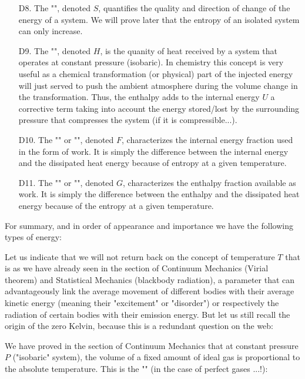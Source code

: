 \begin{enumerate}
		\item[D8.] The "", denoted $S$, quantifies the quality and direction of change of the energy of a system. We will prove later that the entropy of an isolated system can only increase.
		
		\item[D9.] The "", denoted $H$, is the quanity of heat received by a system that operates at constant pressure (isobaric). In chemistry this concept is very useful as a chemical transformation (or physical) part of the injected energy will just served to push the ambient atmosphere during the volume change in the transformation. Thus, the enthalpy adds to the internal energy $U$ a corrective term taking into account the energy  stored/lost by the surrounding pressure that compresses the system (if it is compressible...).
		
		\item[D10.] The "" or "", denoted $F$, characterizes the internal energy fraction used in the form of work. It is simply the difference between the internal energy and the dissipated heat energy because of entropy at a given temperature.
		
		\item[D11.] The "" or "", denoted $G$, characterizes the enthalpy fraction available as work. It is simply the difference between the enthalpy and the dissipated heat energy because of the entropy at a given temperature.
	\end{enumerate}
	For summary, and in order of appearance and importance we have the following types of energy:
	
	Let us indicate that we will not return back on the concept of temperature $T$ that is as we have already seen in the section of Continuum Mechanics (Virial theorem) and Statistical Mechanics (blackbody radiation), a parameter that can advantageously link the average movement of different bodies with their average kinetic energy (meaning their "excitement" or "disorder") or respectively the radiation of certain bodies with their emission energy. But let us still recall the origin of the zero Kelvin, because this is a redundant question on the web:
	
	We have proved in the section of Continuum Mechanics that at constant pressure $P$ ("isobaric" system), the volume of a fixed amount of ideal gas is proportional to the absolute temperature. This is the "" (in the case of perfect gases ...!):
	
